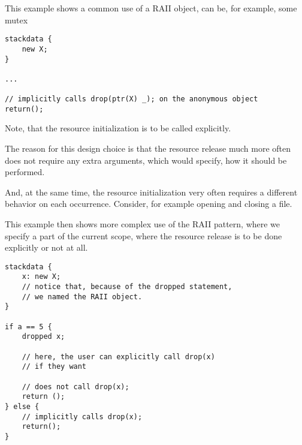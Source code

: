 \begin{ex}
    This example shows a common use of a RAII object,  can be, for example, some mutex
    \begin{lstlisting}
stackdata {
    new X;
}

...

// implicitly calls drop(ptr(X) _); on the anonymous object
return();
    \end{lstlisting}
\end{ex}

\begin{remark}
    Note, that the resource initialization is to be called explicitly.

    The reason for this design choice is that the resource release much more often does not require any extra arguments, which would specify, how it should be performed.

    And, at the same time, the resource initialization very often requires a different behavior on each occurrence. Consider, for example opening and closing a file.
\end{remark}

\begin{ex}
    This example then shows more complex use of the RAII pattern, where we specify a part of the current scope, where the resource release is to be done explicitly or not at all.

    \begin{lstlisting}
stackdata {
    x: new X;
    // notice that, because of the dropped statement,
    // we named the RAII object.
}

if a == 5 {
    dropped x;

    // here, the user can explicitly call drop(x)
    // if they want

    // does not call drop(x);
    return ();
} else {
    // implicitly calls drop(x);
    return();
}
    \end{lstlisting}
\end{ex}
